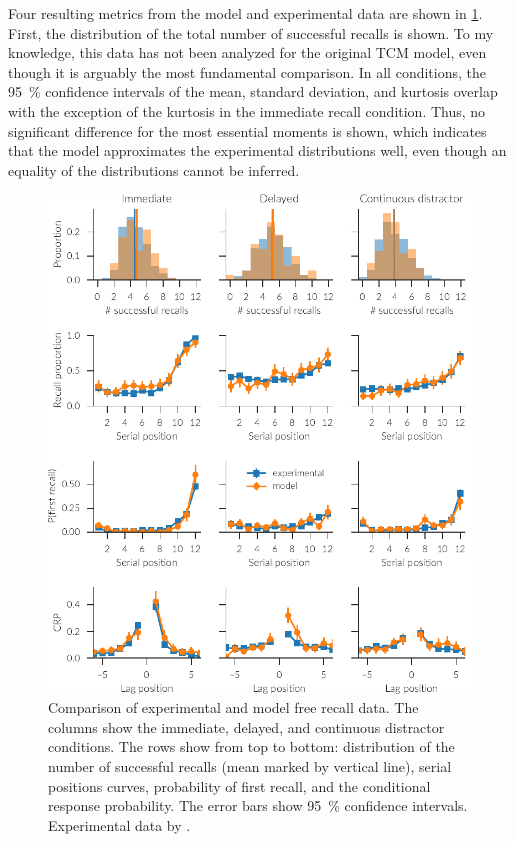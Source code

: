 Four resulting metrics from the model and experimental data are shown in \cref{fig:results-free}.
First, the distribution of the total number of successful recalls is shown.
To my knowledge, this data has not been analyzed for the original TCM model, even though it is arguably the most fundamental comparison.
In all conditions, the \SI{95}{\percent} confidence intervals of the mean, standard deviation, and kurtosis overlap with the exception of the kurtosis in the immediate recall condition.
Thus, no significant difference for the most essential moments is shown, which indicates that the model approximates the experimental distributions well, even though an equality of the distributions cannot be inferred.
\begin{figure}
    \centering
    \includegraphics[trim=0 6 0 6]{figures/results/free}
    \caption[Comparison of experimental and model free recall data.]{Comparison of experimental and model free recall data. The columns show the immediate, delayed, and continuous distractor conditions. The rows show from top to bottom: distribution of the number of successful recalls (mean marked by vertical line), serial positions curves, probability of first recall, and the conditional response probability. The error bars show \SI{95}{\percent} confidence intervals. Experimental data by \textcite{Howard1999}.}\label{fig:results-free}
\end{figure}

